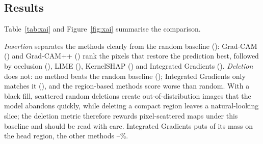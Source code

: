 \documentclass[11pt,a4paper]{article}
\begin{document}
\subsection{Results}
Table~\ref{tab:xai} and Figure~\ref{fig:xai} summarise the comparison.

\begin{table}[t]
\centering\small
\caption{Faithfulness (mean $\pm$ s.d.\ over 100 Testing images), attribution mass on the head region, and Spearman correlation with the trained-model map after randomising the classifier only and after randomising the whole network (12 images).}
\label{tab:xai}
\resizebox{\linewidth}{!}{}
\end{table}

\emph{Insertion} separates the methods clearly from the random baseline (\InsRandom{}): Grad-CAM (\InsGradcam{}) and Grad-CAM++ (\InsGradcamPP{}) rank the pixels that restore the prediction best, followed by occlusion (\InsOcclusion{}), LIME (\InsLime{}), KernelSHAP (\InsKernelShap{}) and Integrated Gradients (\InsIntegratedGradients{}). \emph{Deletion} does not: no method beats the random baseline (\DelRandom{}); Integrated Gradients only matches it (\DelIntegratedGradients{}), and the region-based methods score worse than random. With a black fill, scattered random deletions create out-of-distribution images that the model abandons quickly, while deleting a compact region leaves a natural-looking slice; the deletion metric therefore rewards pixel-scattered maps under this baseline and should be read with care. Integrated Gradients puts \FgIntegratedGradients{} of its mass on the head region, the other methods \FgMin--\FgMax\%.
\end{document}
